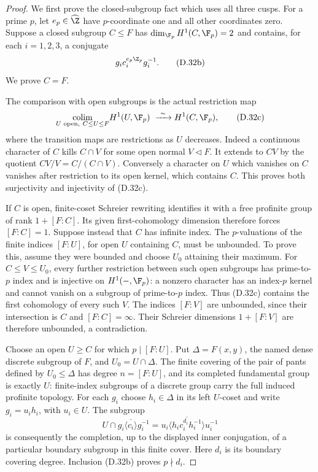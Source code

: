 \begin{proof}
We first prove the closed-subgroup fact which uses all three cusps.
For a prime $p$, let $e_p\in\widehat\Z$ have $p$-coordinate one and
all other coordinates zero.  Suppose a closed subgroup $C\leq F$
has $\dim_{\F_p}H^1(C,\F_p)=2$ and contains, for each $i=1,2,3$,
a conjugate
\[
                    g_i c_i^{e_p\Z_p}g_i^{-1}.             \tag{D.32b}
\]
We prove $C=F$.

The comparison with open subgroups is the actual restriction map
\[
 \underset{U\text{ open},\ C\leq U\leq F}{\operatorname{colim}}
       H^1(U,\F_p)\ \xrightarrow{\ \sim\ } H^1(C,\F_p),
                                                        \tag{D.32c}
\]
where the transition maps are restrictions as $U$ decreases.
Indeed a continuous character of $C$ kills $C\cap V$ for some open
normal $V\triangleleft F$.  It extends to $CV$ by the quotient
$CV/V=C/(C\cap V)$.  Conversely a character on $U$ which vanishes
on $C$ vanishes after restriction to its open kernel, which contains
$C$.  This proves both surjectivity and injectivity of (D.32c).

If $C$ is open, finite-coset Schreier rewriting identifies it with
a free profinite group of rank $1+[F:C]$.  Its given first-cohomology
dimension therefore forces $[F:C]=1$.
Suppose instead that $C$ has infinite index.  The $p$-valuations
of the finite indices $[F:U]$, for open $U$ containing $C$, must
be unbounded.  To prove this, assume they were bounded and choose
$U_0$ attaining their maximum.  For $C\leq V\leq U_0$, every
further restriction between such open subgroups has prime-to-$p$
index and is injective on $H^1(-,\F_p)$: a nonzero character has
an index-$p$ kernel and cannot vanish on a subgroup of prime-to-$p$
index.  Thus (D.32c) contains the first cohomology of every such
$V$.  The indices $[F:V]$ are unbounded, since their intersection
is $C$ and $[F:C]=\infty$.  Their Schreier dimensions
$1+[F:V]$ are therefore unbounded, a contradiction.

Choose an open $U\geq C$ for which $p\mid [F:U]$.  Put
$\Delta=F(x,y)$, the named dense discrete subgroup of $F$, and
$U_0=U\cap\Delta$.  The finite covering of the pair of pants
defined by $U_0\leq\Delta$ has degree $n=[F:U]$, and its
completed fundamental group is exactly $U$: finite-index subgroups
of a discrete group carry the full induced profinite topology.
For each $g_i$ choose $h_i\in\Delta$ in its left $U$-coset and
write $g_i=u_i h_i$, with $u_i\in U$.  The subgroup
\[
 U\cap g_i\overline{\langle c_i\rangle}g_i^{-1}
  =u_i\overline{\langle h_i c_i^{d_i}h_i^{-1}\rangle}u_i^{-1}
                                                        \tag{D.32d}
\]
is consequently the completion, up to the displayed inner
conjugation, of a particular boundary subgroup in this finite
cover.  Here $d_i$ is its boundary covering degree.  Inclusion
(D.32b) proves $p\nmid d_i$.


\end{proof}
